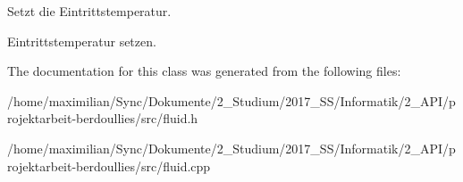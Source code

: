 Setzt die Eintrittstemperatur. 

Eintrittstemperatur setzen. 

The documentation for this class was generated from the following files\+:\begin{DoxyCompactItemize}
\item 
/home/maximilian/\+Sync/\+Dokumente/2\+\_\+\+Studium/2017\+\_\+\+S\+S/\+Informatik/2\+\_\+\+A\+P\+I/projektarbeit-\/berdoullies/src/fluid.\+h\item 
/home/maximilian/\+Sync/\+Dokumente/2\+\_\+\+Studium/2017\+\_\+\+S\+S/\+Informatik/2\+\_\+\+A\+P\+I/projektarbeit-\/berdoullies/src/fluid.\+cpp\end{DoxyCompactItemize}
